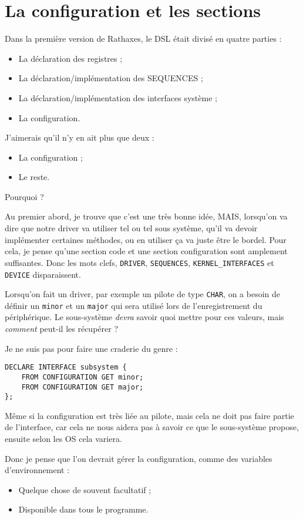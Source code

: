 \documentclass{rtxreport}
\begin{document}
\chapter{La configuration et les sections}

Dans la première version de Rathaxes, le DSL était divisé en quatre parties : 
\begin{itemize}
	\item La déclaration des registres ; 
	\item La déclaration/implémentation des SEQUENCES ; 
	\item La déclaration/implémentation des interfaces système ;
	\item La configuration. 
\end{itemize}

J’aimerais qu’il n’y en ait plus que deux : 
\begin{itemize}
	\item La configuration ; 
	\item Le reste. 
\end{itemize}

Pourquoi ? 

Au premier abord, je trouve que c’est une très bonne idée, MAIS, lorsqu’on va dire que notre driver va utiliser tel ou tel sous système, qu’il va devoir implémenter certaines méthodes, ou en utiliser ça va juste être le bordel. Pour cela, je pense qu’une section code et une section configuration sont amplement suffisantes. Donc les mots clefs, \texttt{DRIVER}, \texttt{SEQUENCES}, \texttt{KERNEL\_INTERFACES} et \texttt{DEVICE} disparaissent. 

Lorsqu’on fait un driver, par exemple un pilote de type \texttt{CHAR}, on a besoin de définir un \texttt{minor} et un \texttt{major} qui sera utilisé lors de l’enregistrement du périphérique. Le sous-système \emph{devra} savoir quoi mettre pour ces valeurs, mais \emph{comment} peut-il les récupérer ?

Je ne suis pas pour faire une craderie du genre :

\begin{lstlisting}
DECLARE INTERFACE subsystem {
	FROM CONFIGURATION GET minor;
	FROM CONFIGURATION GET major;
};
\end{lstlisting}
Même si la configuration est très liée au pilote, mais cela ne doit pas faire partie de l’interface, car cela ne nous aidera pas à savoir ce que le sous-système propose, ensuite selon les OS cela variera.

Donc je pense que l’on devrait gérer la configuration, comme des variables d’environnement :
\begin{itemize}
	\item Quelque chose de souvent facultatif ; 
	\item Disponible dans tous le programme.
\end{itemize}
\end{document}
